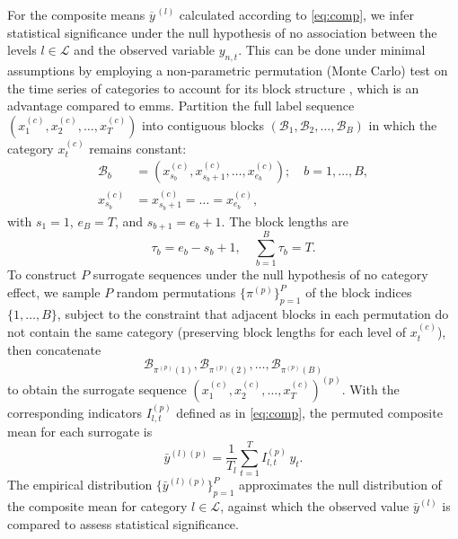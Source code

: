 \begin{subappendices}
    For the composite means $\overline{y}^{\,(l)}$ calculated according to \cref{eq:comp}, we infer statistical significance under the null hypothesis of no association between the levels $l \in \mathcal{L}$ and the observed variable $y_{n,t}$. This can be done under minimal assumptions by employing a non-parametric permutation (Monte Carlo) test on the time series of categories to account for its block structure \parencite{goodPermutationParametricBootstrap2005}, which is an advantage compared to \glspl{emm}. Partition the full label sequence $(x^{(c)}_1, x^{(c)}_2, \ldots, x^{(c)}_T)$ into
    contiguous blocks $(\mathcal{B}_1, \mathcal{B}_2, \ldots, \mathcal{B}_B)$ in
    which the category $x_t^{(c)}$ remains constant:
    \begin{align}
        \mathcal{B}_b & = (x^{(c)}_{s_b}, x^{(c)}_{s_b+1}, \ldots, x^{(c)}_{e_b}); \quad
        b = 1, \ldots, B,                                                                \\
        x^{(c)}_{s_b} & = x^{(c)}_{s_b+1} = \ldots = x^{(c)}_{e_b},
    \end{align}
    with $s_1 = 1$, $e_B = T$, and $s_{b+1} = e_b + 1$. The block lengths are
    \begin{equation}
        \tau_b = e_b - s_b + 1, \quad \sum_{b=1}^B \tau_b = T.
    \end{equation}
    To construct $P$ surrogate sequences under the null hypothesis of no category
    effect, we sample $P$ random permutations $\{\pi^{(p)}\}_{p=1}^P$ of the block
    indices $\{1, \ldots, B\}$, subject to the constraint that adjacent blocks in
    each permutation do not contain the same category (preserving block lengths for
    each level of $x_t^{(c)}$), then concatenate
    \begin{equation}
        \mathcal{B}_{\pi^{(p)}(1)}, \mathcal{B}_{\pi^{(p)}(2)},
        \ldots, \mathcal{B}_{\pi^{(p)}(B)}
    \end{equation}
    to obtain the surrogate sequence $(x^{(c)}_1, x^{(c)}_2, \ldots, x^{(c)}_T)^{(p)}$.
    With the corresponding indicators $I^{(p)}_{l,t}$ defined as in \cref{eq:comp},
    the permuted composite mean for each surrogate is
    \begin{equation}
        \bar{y}^{(l)(p)} = \frac{1}{T_l} \sum_{t=1}^T I^{(p)}_{l,t} \, y_t.
    \end{equation}
    The empirical distribution $\{\bar{y}^{(l)(p)}\}_{p=1}^P$ approximates the null
    distribution of the composite mean for category $l \in \mathcal{L}$, against
    which the observed value $\bar{y}^{(l)}$ is compared to assess statistical
    significance.



\end{subappendices}
